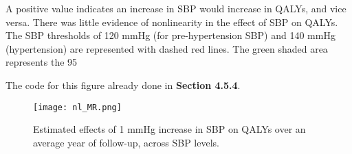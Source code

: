 \documentclass[11pt]{article}
\begin{document}
A positive value indicates an increase in SBP would increase in QALYs, and vice versa. There was little evidence of nonlinearity in the effect of SBP on QALYs. The SBP thresholds of 120 mmHg (for pre-hypertension SBP) and 140 mmHg (hypertension) are represented with dashed red lines. The green shaded area represents the 95%

The code for this figure already done in \textbf{Section 4.5.4}.  
\begin{figure}[htbp]
  \centering
  \texttt{[image: nl\_MR.png]}
  \caption{Estimated effects of 1 mmHg increase in SBP on QALYs over an average year of follow-up, across SBP levels.}
  \label{fig:5}
\end{figure}
\newpage
\color{black}


\end{document}
